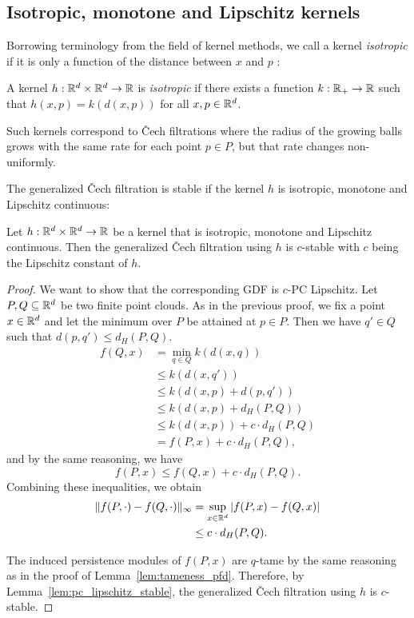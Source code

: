 \subsection{Isotropic, monotone and Lipschitz kernels}

Borrowing terminology from the field of kernel methods, we call a kernel
\emph{isotropic}
if it is only a function of the distance between $x$ and $p$
\cite{genton2001classes}:
\begin{definition}
    A kernel $h : \mathbb{R}^d \times \mathbb{R}^d \to \mathbb{R}$ is \emph{isotropic} if there exists a
    function $k : \mathbb{R}_+ \to \mathbb{R}$ such that $h(x, p) = k(d(x, p))$ for all
    $x, p \in \mathbb{R}^d$.
\end{definition}
Such kernels correspond to \v{C}ech filtrations where the radius of the growing
balls grows with the same rate for each point $p \in P$, but that rate changes
non-uniformly.

The generalized \v{C}ech filtration is stable if the kernel $h$ is isotropic,
monotone and Lipschitz continuous:
\begin{theorem}
    Let $h : \mathbb{R}^d \times \mathbb{R}^d \to \mathbb{R}$ be a kernel that is isotropic, monotone
    and Lipschitz continuous. Then the generalized \v{C}ech filtration using $h$
    is $c$-stable with $c$ being the Lipschitz constant of $h$.
\end{theorem}
\begin{proof}
    We want to show that the corresponding GDF is $c$-PC Lipschitz. Let $P, Q
    \subseteq \mathbb{R}^d$ be two finite point clouds. As in the previous proof, we
    fix a point $x \in \mathbb{R}^d$ and let the minimum over $P$ be attained at
    $p \in P$. Then we have $q' \in Q$ such that $d(p, q') \leq d_H(P, Q)$.
    \begin{align}
        f(Q, x) & = \min_{q \in Q} k(d(x, q)) \\
        & \leq k(d(x, q')) \\
        & \leq k(d(x, p) + d(p, q')) \\
        & \leq k(d(x, p) + d_H(P, Q)) \\
        & \leq k(d(x, p)) + c \cdot d_H(P, Q) \\
        & = f(P, x) + c \cdot d_H(P, Q),
    \end{align}
    and by the same reasoning, we have
    \begin{equation}
        f(P, x) \leq f(Q, x) + c \cdot d_H(P, Q).
    \end{equation}
    Combining these inequalities, we obtain
    \begin{align}
        \lVert f(P, \cdot) - f(Q, \cdot)\rVert_\infty
        & = \sup_{x \in \mathbb{R}^d} |f(P, x) - f(Q, x)| \\
        & \leq c \cdot d_H(P, Q).
    \end{align}

    The induced persistence modules of $f(P, x)$ are $q$-tame by the same
    reasoning as in the proof of Lemma~\ref{lem:tameness_pfd}. Therefore, by
    Lemma~\ref{lem:pc_lipschitz_stable}, the generalized \v{C}ech
    filtration using $h$ is $c$-stable.
\end{proof}

